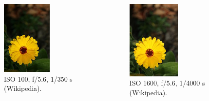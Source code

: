\begin{frame}[allowframebreaks]
  \framebreak

  \begin{columns}[c]
    \begin{figure}[h!]
    \centering
    \includegraphics[width=0.6\textwidth]{images/comparison01.jpg}
    \caption{ISO 100, f/5.6, 1/350 s (Wikipedia).}
    \label{fig:comparison01}
    \end{figure}
 
    \begin{figure}[h!]
    \centering
    \includegraphics[width=0.6\textwidth]{images/comparison02.jpg}
    \caption{ISO 1600, f/5.6, 1/4000 s (Wikipedia).}
    \label{fig:comparison02}
    \end{figure}
 

\end{columns}
\end{frame}
